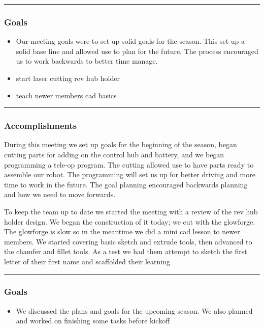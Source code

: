 \noindent\hfil\rule{\textwidth}{.4pt}\hfil
\subsubsection*{Goals}
\begin{itemize}
    \item Our meeting goals were to set up solid goals for the season. This set up a solid base line and allowed use to plan for the future. The process encouraged us to work backwards to better time manage. 
    \item start laser cutting rev hub holder
	\item teach newer members cad basics

\end{itemize} 

\noindent\hfil\rule{\textwidth}{.4pt}\hfil

\subsubsection*{Accomplishments}
During this meeting we set up goals for the beginning of the season, began cutting parts for adding on the control hub and battery, and we began programming a tele-op program. The cutting allowed use to have parts ready to assemble our robot. The programming will set us up for better driving and more time to work in the future. The goal planning encouraged backwards planning and how we need to move forwards.

To keep the team up to date we started the meeting with a review of the rev hub holder design. We began the construction of it today; we cut with the glowforge. The glowforge is slow so in the meantime we did a mini cad lesson to newer members. We started covering basic sketch and extrude tools, then advanced to the chamfer and fillet tools. As a test we had them attempt to sketch the first letter of their first name and scaffolded their learning

\noindent\hfil\rule{\textwidth}{.4pt}\hfil
\subsubsection*{Goals}
\begin{itemize}
    \item We discussed the plans and goals for the upcoming season. We also planned and worked on finishing some tasks before kickoff

\end{itemize} 

